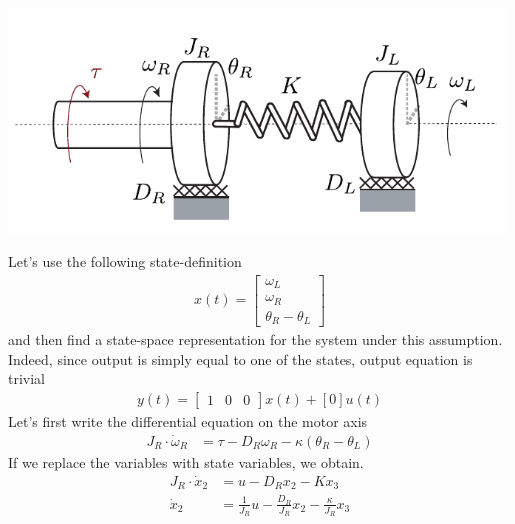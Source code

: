 \documentclass[twoside]{article}
\theoremstyle{definition}
\begin{document}
\begin{minipage}[h]{1\linewidth}
    \begin{center}
      \includegraphics[width=0.99\textwidth]{system_model}
    \end{center}
\end{minipage}

Let's use the following state-definition 
%
\begin{align*}
  x(t) = \left[ \begin{array}{c} \omega_L \\ \omega_R \\ \theta_R - \theta_L \end{array} \right]
\end{align*}    
%
and then find a state-space representation for the system under this assumption. 
Indeed, since output is simply equal to one of the states, output equation is 
trivial 
%
\begin{align*}
  y(t) = \left[ \begin{array}{cccc} 1 & 0 & 0 \end{array} \right] x(t) + [0] u(t)
\end{align*}    
%  
Let's first write the differential equation on the motor axis
%
\begin{align*}
J_R \cdot \dot{\omega}_R &= \tau - D_R \omega_R  - \kappa (
                           \theta_R - \theta_L)
\end{align*}    
%  
If we replace the variables with state variables, we obtain. 
%
\begin{align*}
J_R \cdot \dot{x}_2 &= u - D_R x_2  - K x_3
\\
\dot{x}_2 &= \frac{1}{J_R} u - \frac{D_R}{J_R} x_2 - \frac{\kappa}{J_R} x_3
\end{align*}    
%  
\end{document}
